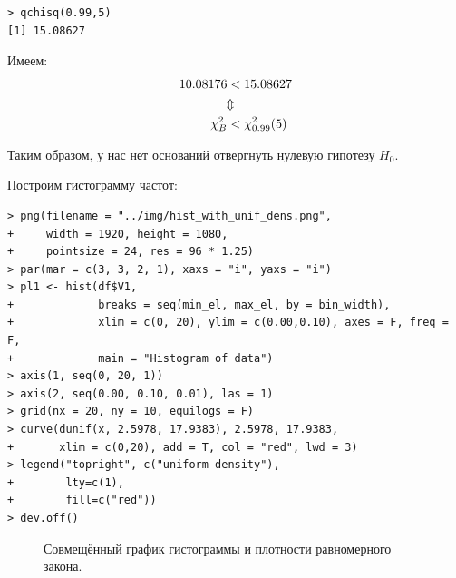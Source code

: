 \documentclass[14pt,a4paper]{scrartcl}
\begin{document}
\begin{verbatim}
> qchisq(0.99,5)
[1] 15.08627
\end{verbatim}

Имеем:
\begin{align*}
10.08176 &< 15.08627 \\
&\rotatebox[origin=c]{-90}{$\Leftrightarrow$} \notag \\ 
\chi^2_B &< {\chi^2_{0.99} (5)}
\end{align*}


Таким образом, у нас нет оснований отвергнуть нулевую гипотезу $H_0$.


Построим гистограмму частот:
\begin{verbatim}
> png(filename = "../img/hist_with_unif_dens.png", 
+     width = 1920, height = 1080,
+     pointsize = 24, res = 96 * 1.25)
> par(mar = c(3, 3, 2, 1), xaxs = "i", yaxs = "i")
> pl1 <- hist(df$V1,
+             breaks = seq(min_el, max_el, by = bin_width), 
+             xlim = c(0, 20), ylim = c(0.00,0.10), axes = F, freq = F,
+             main = "Histogram of data")
> axis(1, seq(0, 20, 1))
> axis(2, seq(0.00, 0.10, 0.01), las = 1)
> grid(nx = 20, ny = 10, equilogs = F)
> curve(dunif(x, 2.5978, 17.9383), 2.5978, 17.9383, 
+       xlim = c(0,20), add = T, col = "red", lwd = 3)
> legend("topright", c("uniform density"), 
+        lty=c(1), 
+        fill=c("red"))
> dev.off()
\end{verbatim}

\begin{figure}[h]
	\caption{Совмещённый график гистограммы и плотности равномерного закона.}
	\label{ris:hist_with_unif_dens}
\end{figure}
\end{document}
